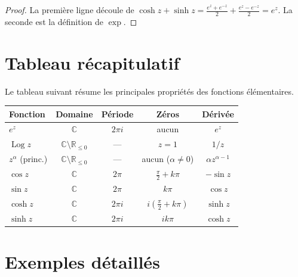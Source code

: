 \documentclass[12pt,a4paper,openany]{book}
\theoremstyle{definition}
\theoremstyle{plain}
\theoremstyle{remark}
\newcommand{\C}{\mathbb{C}}
\newcommand{\R}{\mathbb{R}}
\DeclareMathOperator{\Log}{Log}
\begin{document}
\begin{proof}
La première ligne découle de $\cosh z + \sinh z = \frac{e^z+e^{-z}}{2} + \frac{e^z-e^{-z}}{2} = e^z$. La seconde est la définition de $\exp$.
\end{proof}

\section{Tableau récapitulatif}\label{sec:tableau-recap}

Le tableau suivant résume les principales propriétés des fonctions élémentaires.

\begin{center}
\renewcommand{\arraystretch}{1.6}
\begin{tabular}{@{}lcccc@{}}
\toprule
\textbf{Fonction} & \textbf{Domaine} & \textbf{Période} & \textbf{Zéros} & \textbf{Dérivée} \\
\midrule
$e^z$ & $\C$ & $2\pi i$ & aucun & $e^z$ \\
$\Log z$ & $\C \setminus \R_{\leq 0}$ & --- & $z = 1$ & $1/z$ \\
$z^\alpha$ (princ.) & $\C \setminus \R_{\leq 0}$ & --- & aucun ($\alpha \neq 0$) & $\alpha z^{\alpha-1}$ \\
$\cos z$ & $\C$ & $2\pi$ & $\frac{\pi}{2} + k\pi$ & $-\sin z$ \\
$\sin z$ & $\C$ & $2\pi$ & $k\pi$ & $\cos z$ \\
$\cosh z$ & $\C$ & $2\pi i$ & $i(\frac{\pi}{2}+k\pi)$ & $\sinh z$ \\
$\sinh z$ & $\C$ & $2\pi i$ & $ik\pi$ & $\cosh z$ \\
\bottomrule
\end{tabular}
\end{center}

\section{Exemples détaillés}\label{sec:exemples-detaillés}
\end{document}
